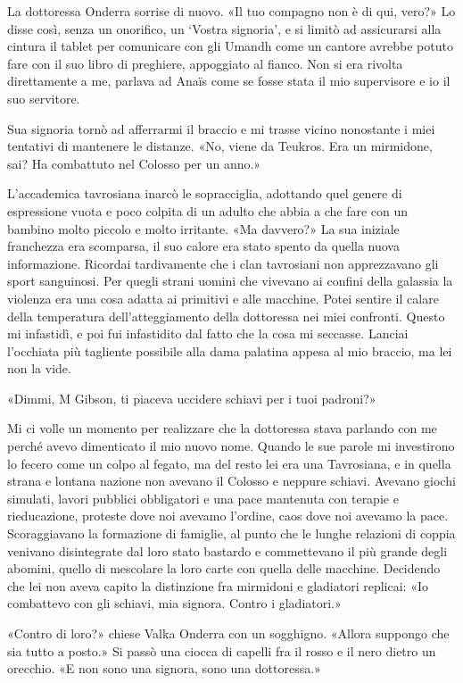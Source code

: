 La dottoressa Onderra sorrise di nuovo. «Il tuo compagno non è di qui,
vero?» Lo disse così, senza un onorifico, un `Vostra signoria', e si
limitò ad assicurarsi alla cintura il tablet per comunicare con gli
Umandh come un cantore avrebbe potuto fare con il suo libro di
preghiere, appoggiato al fianco. Non si era rivolta direttamente a me,
parlava ad Anaïs come se fosse stata il mio supervisore e io il suo
servitore.

Sua signoria tornò ad afferrarmi il braccio e mi trasse vicino
nonostante i miei tentativi di mantenere le distanze. «No, viene da
Teukros. Era un mirmidone, sai? Ha combattuto nel Colosso per un anno.»

L'accademica tavrosiana inarcò le sopracciglia, adottando quel genere di
espressione vuota e poco colpita di un adulto che abbia a che fare con
un bambino molto piccolo e molto irritante. «Ma davvero?» La sua
iniziale franchezza era scomparsa, il suo calore era stato spento da
quella nuova informazione. Ricordai tardivamente che i clan tavrosiani
non apprezzavano gli sport sanguinosi. Per quegli strani uomini che
vivevano ai confini della galassia la violenza era una cosa adatta ai
primitivi e alle macchine. Potei sentire il calare della temperatura
dell'atteggiamento della dottoressa nei miei confronti. Questo mi
infastidì, e poi fui infastidito dal fatto che la cosa mi seccasse.
Lanciai l'occhiata più tagliente possibile alla dama palatina appesa al
mio braccio, ma lei non la vide.

«Dimmi, M Gibson, ti piaceva uccidere schiavi per i tuoi padroni?»

Mi ci volle un momento per realizzare che la dottoressa stava parlando
con me perché avevo dimenticato il mio nuovo nome. Quando le sue parole
mi investirono lo fecero come un colpo al fegato, ma del resto lei era
una Tavrosiana, e in quella strana e lontana nazione non avevano il
Colosso e neppure schiavi. Avevano giochi simulati, lavori pubblici
obbligatori e una pace mantenuta con terapie e rieducazione, proteste
dove noi avevamo l'ordine, caos dove noi avevamo la pace. Scoraggiavano
la formazione di famiglie, al punto che le lunghe relazioni di coppia
venivano disintegrate dal loro stato bastardo e commettevano il più
grande degli abomini, quello di mescolare la loro carte con quella delle
macchine. Decidendo che lei non aveva capito la distinzione fra
mirmidoni e gladiatori replicai: «Io combattevo con gli schiavi, mia
signora. Contro i gladiatori.»

«Contro di loro?» chiese Valka Onderra con un sogghigno. «Allora
suppongo che sia tutto a posto.» Si passò una ciocca di capelli fra il
rosso e il nero dietro un orecchio. «E non sono una signora, sono una
dottoressa.»


